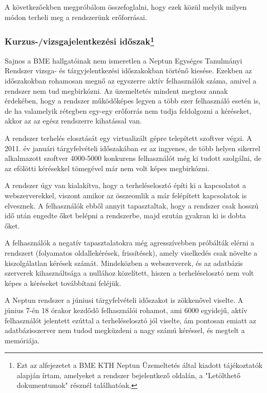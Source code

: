 A következőekben megpróbálom összefoglalni, hogy ezek közül melyik milyen módon terheli meg a rendszerünk erőforrásai.

\subsubsection{Kurzus-/vizsgajelentkezési időszak\protect\footnote{Ezt az alfejezetet a BME KTH Neptun Üzemeltetés által kiadott tájékoztatók alapján írtam, amelyeket a rendszer bejelentkező oldalán, a "Letölthető dokumentumok" résznél találhatóak.}}

Sajnos a BME hallgatóinak nem ismeretlen a Neptun Egységes Tanulmányi Rendszer vizsga- és tárgyjelentkezési időszakokban történő kiesése. Ezekben az időszakokban rohamosan megnő az egyszerre aktív felhasználók száma, amivel a rendszer nem tud megbirkózni. Az üzemeltetés mindent megtesz annak érdekében, hogy a rendszer működőképes legyen a több ezer felhasználó esetén is, de ha valamelyik rétegben egy-egy erőforrás nem tudja feldolgozni a kéréseket, akkor az az egész rendszerre kihatással van.

A rendszer terhelés elosztását egy virtualizált gépre telepített szoftver végzi. A 2011. év januári tárgyfelvételi időszakában ez az ingyenes, de több helyen sikerrel alkalmazott szoftver 4000-5000 konkurens felhasználót még ki tudott szolgálni, de az efölötti kérésekkel tömegével már nem volt képes megbirkózni.

A rendszer úgy van kialakítva, hogy a terheléselosztó építi ki a kapcsolatot a webszerverekkel, viszont amikor az összeomlik a már felépített kapcsolatok is elvesznek. A felhasználók ebből annyit tapasztaltak, hogy a rendszer csak hosszú idő után engedte őket belépni a rendszerbe, majd ezután gyakran ki is dobta őket.

A felhasználók a negatív tapasztalatokra még agresszívebben próbálták elérni a rendszert (folyamatos oldallekérések, frissítések), amely viselkedés csak növelte a kiszolgálatlan kérések számát. Mindeközben a webszerverek, és az adatbázis szerverek kihasználtsága a nullához közelített, hiszen a terheléselosztó nem   volt képes a kéréseket továbbítani feléjük.

A Neptun rendszer a júniusi tárgyfelvételi időszakot is zökkenővel viselte. A június 7-én 18 órakor kezdődő felhasználói rohamot, ami 6000 egyidejű, aktív felhasználót jelentett ezúttal a terheléselosztó jól viselte, ám pontosan emiatt az adatbázisszerver nem tudod megküzdeni a nagy számú kéréssel, és megtelt a memóriája.

